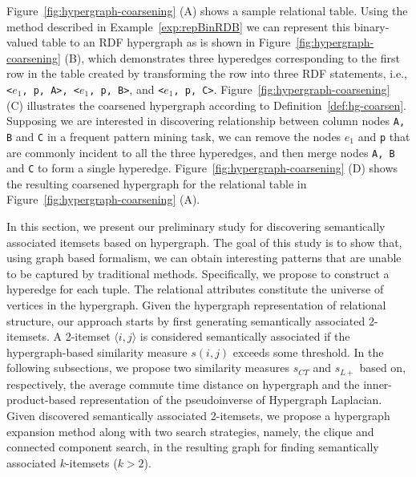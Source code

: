 \begin{myexp}
\label{column-wise-hg}
Figure~\ref{fig:hypergraph-coarsening} (A) shows a sample relational table. Using the method described in Example~\ref{exp:repBinRDB} we can represent this binary-valued table to an RDF hypergraph as is shown in Figure~\ref{fig:hypergraph-coarsening} (B), which demonstrates three hyperedges corresponding to the first row in the table created by transforming the row into three RDF statements, i.e., \texttt{<$e_1$, p, A>, <$e_1$, p, B>}, and \texttt{<$e_1$, p, C>}. Figure~\ref{fig:hypergraph-coarsening} (C) illustrates the coarsened hypergraph according to Definition~\ref{def:hg-coarsen}. Supposing we are interested in discovering relationship between column nodes \texttt{A, B} and \texttt{C} in a frequent pattern mining task, we can remove the nodes \texttt{$e_1$} and \texttt{p} that are commonly incident to all the three hyperedges, and then merge nodes \texttt{A, B} and \texttt{C} to form a single hyperedge. Figure~\ref{fig:hypergraph-coarsening} (D) shows the resulting coarsened hypergraph for the relational table in Figure~\ref{fig:hypergraph-coarsening} (A).
\end{myexp}

In this section, we present our preliminary study for discovering semantically associated itemsets based on hypergraph. The goal of this study is to show that, using graph based formalism, we can obtain interesting patterns that are unable to be captured by traditional methods. Specifically, we propose to construct a hyperedge for each tuple. The relational attributes constitute the universe of vertices in the hypergraph. Given the hypergraph representation of relational structure, our approach starts by first generating semantically associated 2-itemsets. A 2-itemset $\langle i,j \rangle$ is considered semantically associated if the hypergraph-based similarity measure $s(i,j)$ exceeds some threshold. In the following subsections, we propose two similarity measures $s_{CT}$ and $s_{L+}$ based on, respectively, the average commute time distance on hypergraph and the inner-product-based representation of the pseudoinverse of Hypergraph Laplacian. Given discovered semantically associated 2-itemsets, we propose a hypergraph expansion method along with two search strategies, namely, the clique and connected component search, in the resulting graph for finding semantically associated $k$-itemsets ($k>2$).

